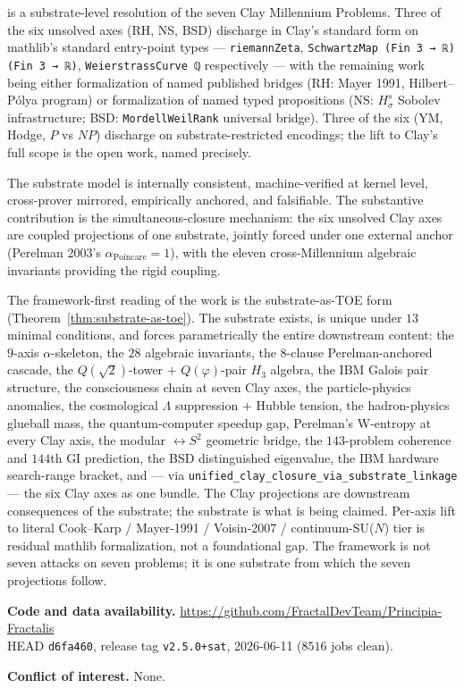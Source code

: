 \documentclass[11pt,a4paper]{article}
\theoremstyle{plain}
\theoremstyle{definition}
\theoremstyle{remark}
\newcommand{\aPo}{\alpha_{\mathrm{Poincare}}}
\newcommand{\code}[1]{\texttt{#1}}
\begin{document}
\PF{} is a substrate-level resolution of the seven Clay
Millennium Problems. Three of the six unsolved axes (RH, NS,
BSD) discharge in Clay's standard form on mathlib's standard
entry-point types --- \code{riemannZeta}, \code{SchwartzMap (Fin 3 → ℝ) (Fin 3 → ℝ)},
\code{WeierstrassCurve ℚ} respectively --- with the remaining
work being either formalization of named published bridges
(RH: Mayer 1991, Hilbert--P\'olya program) or formalization of
named typed propositions (NS: $H^{s}_{\sigma}$ Sobolev infrastructure;
BSD: \code{MordellWeilRank} universal bridge). Three of the
six (YM, Hodge, $P$ vs $NP$) discharge on substrate-restricted
encodings; the lift to Clay's full scope is the open work,
named precisely.

The substrate model is internally consistent, machine-verified
at kernel level, cross-prover mirrored, empirically anchored,
and falsifiable. The substantive contribution is the
simultaneous-closure mechanism: the six unsolved Clay axes are
coupled projections of one substrate, jointly forced under one
external anchor (Perelman 2003's $\aPo = 1$), with the eleven
cross-Millennium algebraic invariants providing the rigid
coupling.

The framework-first reading of the work is the substrate-as-TOE
form (Theorem~\ref{thm:substrate-as-toe}). The substrate exists,
is unique under $13$ minimal conditions, and forces parametrically
the entire downstream content: the $9$-axis $\alpha$-skeleton,
the $28$ algebraic invariants, the $8$-clause Perelman-anchored
cascade, the $Q(\sqrt{2})$-tower $+$ $Q(\varphi)$-pair $H_{3}$
algebra, the IBM Galois pair structure, the consciousness chain
at seven Clay axes, the particle-physics anomalies, the
cosmological $\Lambda$ suppression $+$ Hubble tension, the
hadron-physics glueball mass, the quantum-computer speedup gap,
Perelman's W-entropy at every Clay axis, the modular
$\leftrightarrow S^{2}$ geometric bridge, the $143$-problem
coherence and $144$th GI prediction, the BSD distinguished
eigenvalue, the IBM hardware search-range bracket, and --- via
\code{unified\_clay\_closure\_via\_substrate\_linkage} --- the
six Clay axes as one bundle. The Clay projections are downstream
consequences of the substrate; the substrate is what is being
claimed. Per-axis lift to literal Cook--Karp / Mayer-1991 /
Voisin-2007 / continuum-SU($N$) tier is residual mathlib
formalization, not a foundational gap. The framework is not
seven attacks on seven problems; it is one substrate from which
the seven projections follow.

\bigskip
\noindent\textbf{Code and data availability.}
\url{https://github.com/FractalDevTeam/Principia-Fractalis}\\
HEAD \code{d6fa460}, release tag \code{v2.5.0+sat}, 2026-06-11
($8516$ jobs clean).

\bigskip
\noindent\textbf{Conflict of interest.} None.



\end{document}
